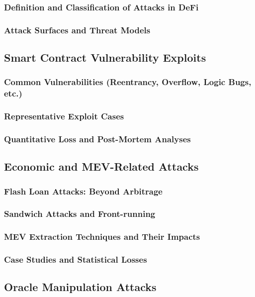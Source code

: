 \documentclass[conference]{IEEEtran}
\begin{document}
    \subsubsection{Definition and Classification of Attacks in DeFi}
    \subsubsection{Attack Surfaces and Threat Models}
\subsection{Smart Contract Vulnerability Exploits}
    \subsubsection{Common Vulnerabilities (Reentrancy, Overflow, Logic Bugs, etc.)}
    \subsubsection{Representative Exploit Cases}
    \subsubsection{Quantitative Loss and Post-Mortem Analyses}
\subsection{Economic and MEV-Related Attacks}
    \subsubsection{Flash Loan Attacks: Beyond Arbitrage}
    \subsubsection{Sandwich Attacks and Front-running}
    \subsubsection{MEV Extraction Techniques and Their Impacts}
    \subsubsection{Case Studies and Statistical Losses}
\subsection{Oracle Manipulation Attacks}
\end{document}
